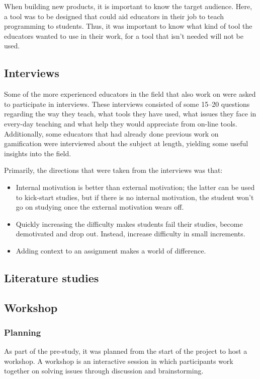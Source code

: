 When building new products, it is important to know the target audience. Here, a tool was to be designed that could aid educators in their job to teach programming to students. Thus, it was important to know what kind of tool the educators wanted to use in their work, for a tool that isn't needed will not be used.

\subsection{Interviews}
Some of the more experienced educators in the field that also work on \LTU{} were asked to participate in interviews. These interviews consisted of some 15--20 questions regarding the way they teach, what tools they have used, what issues they face in every-day teaching and what help they would appreciate from on-line tools. Additionally, some educators that had already done previous work on gamification were interviewed about the subject at length, yielding some useful insights into the field.

Primarily, the directions that were taken from the interviews was that:
\begin{itemize}
\item Internal motivation is better than external motivation; the latter can be used to kick-start studies, but if there is no internal motivation, the student won't go on studying once the external motivation wears off.
\item Quickly increasing the difficulty makes students fail their studies, become demotivated and drop out. Instead, increase difficulty in small increments.
\item Adding context to an assignment makes a world of difference.
\end{itemize}

\subsection{Literature studies}

\subsection{Workshop}
\subsubsection{Planning}
As part of the pre-study, it was planned from the start of the project to host a workshop. A workshop is an interactive session in which participants work together on solving issues through discussion and brainstorming\cite{workshop}. 

